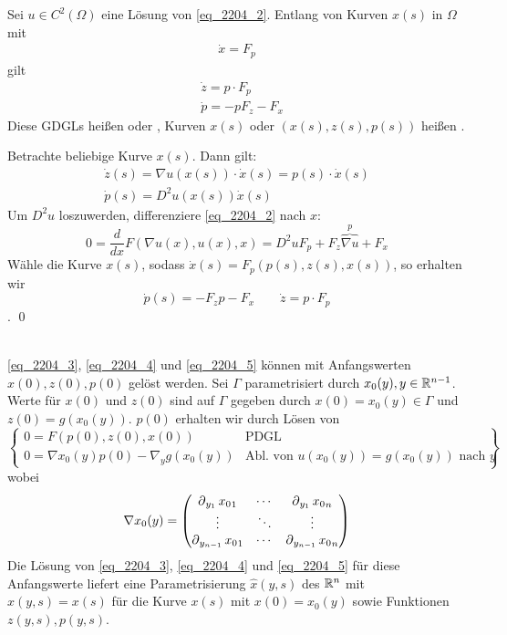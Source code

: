\begin{thm}
\label{thm_charpits} \label{thm_4}
	Sei $u \in C^2(\Omega)$ eine Lösung von \eqref{eq_2204_2}.\marginnote{[4]} Entlang von Kurven $x(s)$ in $\Omega$ mit
	\begin{equation}
	\begin{aligned}
		\dot{x} = F_p \label{eq_2204_3}
	\end{aligned}
	\end{equation}
	gilt
	\begin{align}
		&\dot{z} = p \cdot F_p \label{eq_2204_4} \\
		&\dot{p} = -pF_z - F_x \label{eq_2204_5}
	\end{align}
	Diese GDGLs heißen  oder , Kurven $x(s)$ oder $(x(s),z(s),p(s))$ heißen .
\end{thm}
	
	Betrachte beliebige Kurve $x(s)$. Dann gilt:
	\[ \begin{array}{c}
		\dot{z}(s) = \nabla u(x(s)) \cdot \dot{x}(s) = p(s) \cdot \dot{x}(s) \\
		\dot{p}(s) = D^2u(x(s)) \dot{x}(s)
	\end{array} \]
	Um $D^2u$ loszuwerden, differenziere \eqref{eq_2204_2} nach $x$:
	\[ 0 = \frac{d}{dx} F(\nabla u(x),u(x),x) = D^2 u F_p + F_z \overbrace{\nabla u}^p + F_x \]
	Wähle die Kurve $x(s)$, sodass $\dot{x}(s) = F_p(p(s),z(s),x(s))$, so erhalten wir
	\[ \dot{p}(s) = -F_z p - F_x \qquad \dot{z} = p \cdot F_p \]. \qed

\mbox{} \\
\eqref{eq_2204_3}, \eqref{eq_2204_4} und \eqref{eq_2204_5} können mit Anfangswerten $x(0),z(0),p(0)$ gelöst werden. Sei $\Gamma$ parametrisiert durch $x_0(y), y \in \mathbb{R}^{n-1}$. Werte für $x(0)$ und $z(0)$ sind auf $\Gamma$ gegeben durch $x(0) = x_0(y) \in \Gamma$ und $z(0) = g(x_0(y))$. $p(0)$ erhalten wir durch Lösen von
\begin{equation}
	\left. \begin{cases}
	0 = F(p(0),z(0),x(0)) & \text{PDGL} \\
	0 = \nabla x_0 (y) p(0) - \nabla_y g(x_0(y)) & \text{Abl. von } u(x_0(y)) = g(x_0(y)) \text{ nach } y
	\end{cases} \right\}  \label{eq_2204_7} \end{equation}
wobei
	\[ \nabla x_0 (y) = \begin{pmatrix}
	\operatorname{\partial}_{y_1} {x_0}_1 & \cdots & \operatorname{\partial}_{y_1} {x_0}_n \\ 
	\vdots & \ddots & \vdots \\ 
	\operatorname{\partial}_{y_{n-1}} {x_0}_1 & \cdots & \operatorname{\partial}_{y_{n-1}} {x_0}_n
	\end{pmatrix} \]
Die Lösung von \eqref{eq_2204_3}, \eqref{eq_2204_4} und \eqref{eq_2204_5} für diese Anfangswerte liefert eine Parametrisierung $\widehat{x}(y,s)$ des $\mathbb{R}^n$ mit $\widehat{x}(y,s) = x(s)$ für die Kurve $x(s)$ mit $x(0) = x_0(y)$ sowie Funktionen $z(y,s),p(y,s)$.

